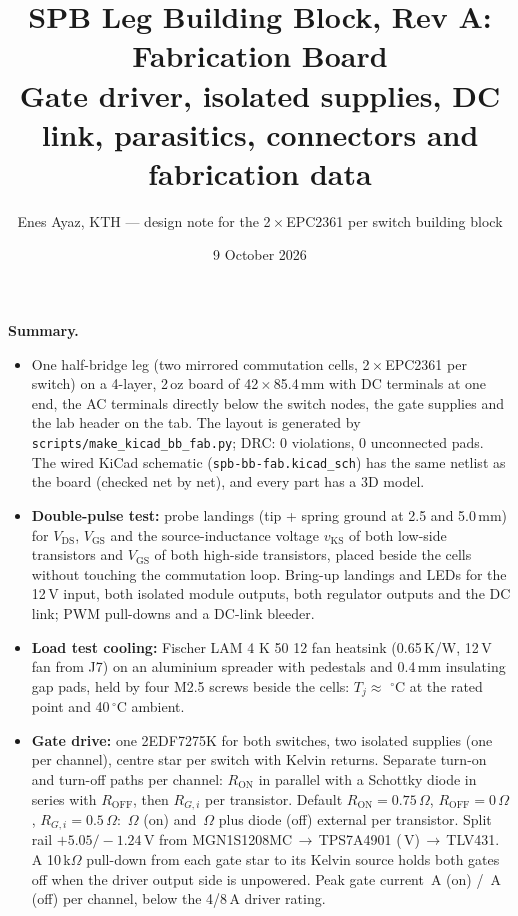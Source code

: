 \documentclass[10pt,a4paper]{article}
\title{\textbf{SPB Leg Building Block, Rev A: Fabrication Board}\\[2pt]
\large Gate driver, isolated supplies, DC link, parasitics, connectors and fabrication data}
\author{Enes Ayaz, KTH --- design note for the 2\,$\times$\,EPC2361 per switch building block}
\date{9 October 2026}
\begin{document}
\maketitle

\noindent\colorbox{box}{\parbox{\dimexpr\linewidth-2\fboxsep}{\small
\textbf{Summary.}
\begin{itemize}\itemsep1pt
\item One half-bridge leg (two mirrored commutation cells, 2\,$\times$\,EPC2361 per switch) on a 4-layer, 2\,oz board of 42\,$\times$\,85.4\,mm with DC terminals at one end, the AC terminals directly below the switch nodes, the gate supplies and the lab header on the tab. The layout is generated by \texttt{scripts/make\_kicad\_bb\_fab.py}; DRC: 0 violations, 0 unconnected pads. The wired KiCad schematic (\texttt{spb-bb-fab.kicad\_sch}) has the same netlist as the board (checked net by net), and every part has a 3D model.
\item \textbf{Double-pulse test:} probe landings (tip + spring ground at 2.5 and 5.0\,mm) for $V_\mathrm{DS}$, $V_\mathrm{GS}$ and the source-inductance voltage $v_\mathrm{KS}$ of both low-side transistors and $V_\mathrm{GS}$ of both high-side transistors, placed beside the cells without touching the commutation loop. Bring-up landings and LEDs for the 12\,V input, both isolated module outputs, both regulator outputs and the DC link; PWM pull-downs and a DC-link bleeder.
\item \textbf{Load test cooling:} Fischer LAM 4 K 50 12 fan heatsink (0.65\,K/W, 12\,V fan from J7) on an aluminium spreader with pedestals and 0.4\,mm insulating gap pads, held by four M2.5 screws beside the cells: $T_j\approx$\,\TjHS\,$^\circ$C at the rated point and 40\,$^\circ$C ambient.
\item \textbf{Gate drive:} one 2EDF7275K for both switches, two isolated supplies (one per channel), centre star per switch with Kelvin returns. Separate turn-on and turn-off paths per channel: $R_\mathrm{ON}$ in parallel with a Schottky diode in series with $R_\mathrm{OFF}$, then $R_{G,i}$ per transistor. Default $R_\mathrm{ON}=0.75\,\Omega$, $R_\mathrm{OFF}=0\,\Omega$, $R_{G,i}=0.5\,\Omega$: \RgFet\,$\Omega$ (on) and \RoffFet\,$\Omega$ plus diode (off) external per transistor. Split rail $+5.05/-1.24$\,V from MGN1S1208MC\,$\rightarrow$\,TPS7A4901 (\Vldo\,V)\,$\rightarrow$\,TLV431. A 10\,k$\Omega$ pull-down from each gate star to its Kelvin source holds both gates off when the driver output side is unpowered. Peak gate current \Ion\,A (on) / \Ioff\,A (off) per channel, below the 4/8\,A driver rating.

\end{itemize}}}
\end{document}
